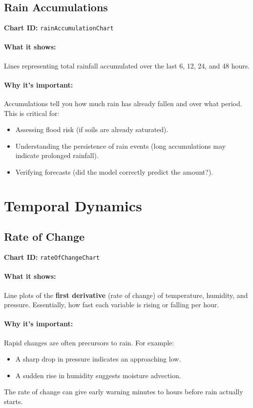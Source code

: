 \documentclass[11pt,a4paper]{article}
\begin{document}
	\subsection{Rain Accumulations}
	\textbf{Chart ID:} \texttt{rainAccumulationChart}
	
	\paragraph{What it shows:}
	Lines representing total rainfall accumulated over the last 6, 12, 24, and 48 hours.
	
	\paragraph{Why it’s important:}
	Accumulations tell you how much rain has already fallen and over what period. This is critical for:
	\begin{itemize}
		\item Assessing flood risk (if soils are already saturated).
		\item Understanding the persistence of rain events (long accumulations may indicate prolonged rainfall).
		\item Verifying forecasts (did the model correctly predict the amount?).
	\end{itemize}
	
	\section{Temporal Dynamics}
	
	\subsection{Rate of Change}
	\textbf{Chart ID:} \texttt{rateOfChangeChart}
	
	\paragraph{What it shows:}
	Line plots of the \textbf{first derivative} (rate of change) of temperature, humidity, and pressure. Essentially, how fast each variable is rising or falling per hour.
	
	\paragraph{Why it’s important:}
	Rapid changes are often precursors to rain. For example:
	\begin{itemize}
		\item A sharp drop in pressure indicates an approaching low.
		\item A sudden rise in humidity suggests moisture advection.
	\end{itemize}
	The rate of change can give early warning minutes to hours before rain actually starts.
	
\end{document}
